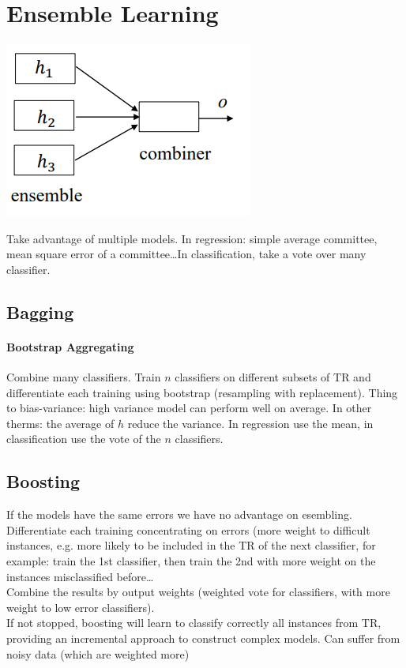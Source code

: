 \documentclass[10pt]{report}
\begin{document}
\section{Ensemble Learning}
\begin{center}
	\includegraphics[scale=0.5]{25.png}
\end{center}
Take advantage of multiple models. In regression: simple average committee, mean square error of a committee\ldots In classification, take a vote over many classifier.
\subsection{Bagging} \paragraph{Bootstrap Aggregating} Combine many classifiers. Train $n$ classifiers on different subsets of TR and differentiate each training using bootstrap (resampling with replacement). Thing to bias-variance: high variance model can perform well on average. In other therms: the average of $h$ reduce the variance. In regression use the mean, in classification use the vote of the $n$ classifiers.
\subsection{Boosting} If the models have the same errors we have no advantage on esembling.\\
Differentiate each training concentrating on errors (more weight to difficult instances, e.g. more likely to be included in the TR of the next classifier, for example: train the 1st classifier, then train the 2nd with more weight on the instances misclassified before\ldots\\
Combine the results by output weights (weighted vote for classifiers, with more weight to low error classifiers).\\
If not stopped, boosting will learn to classify correctly all instances from TR, providing an incremental approach to construct complex models. Can suffer from noisy data (which are weighted more)
\end{document}
